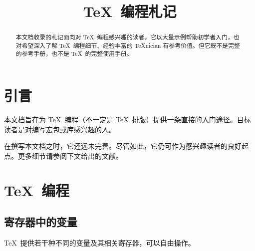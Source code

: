 \documentclass[a4paper,doc2]{ltxdoc}
\title{\TeX\ 编程札记}%
\begin{document}
\maketitle
\begin{abstract}%
	本文档收录的札记面向对 \TeX\ 编程感兴趣的读者。它以大量示例帮助初学者入门，也对希望深入了解 \TeX\ 编程细节、经验丰富的 \TeX nician 有参考价值。但它既不是完整的参考手册，也不是 \TeX\ 的完整使用手册。
\end{abstract}
\tableofcontents
\section{引言}
本文档旨在为 \TeX\ 编程（不一定是 \TeX\ 排版）提供一条直接的入门途径。目标读者是对编写宏包或库感兴趣的人。

在撰写本文档之时，它还远未完善。尽管如此，它仍可作为感兴趣读者的良好起点。更多细节请参阅下文给出的文献。

\section{\TeX\ 编程}
\subsection{寄存器中的变量}
\label{sec:variables}
\TeX\ 提供若干种不同的变量及其相关寄存器，可以自由操作。
\end{document}
